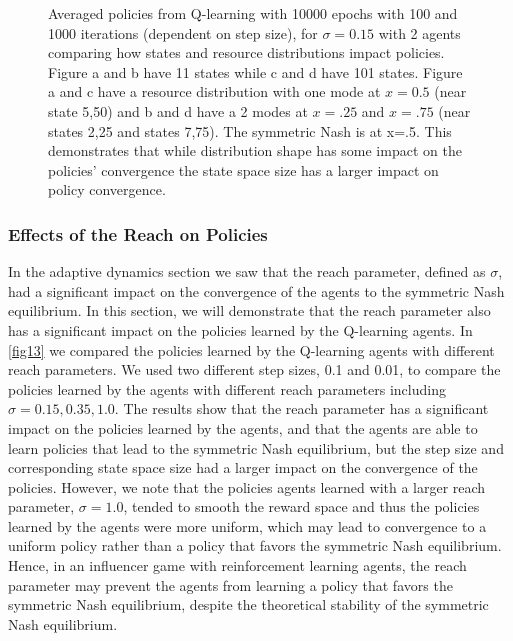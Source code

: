 \documentclass{article}
\begin{document}
\begin{figure}[ht!]
                        
                        \caption{Averaged policies from Q-learning with 10000 epochs with 100 and 1000 iterations (dependent on step size), for $\sigma=0.15$ with 2 agents comparing how states and resource distributions impact policies. Figure a and b have 11 states while c and d have 101 states. Figure a and c have a resource distribution with one mode at $x=0.5$ (near state 5,50) and b and d have a 2 modes at $x=.25$ and $x=.75$ (near states 2,25 and states 7,75). The symmetric Nash is at x=.5. This demonstrates that while distribution shape has some impact on the policies' convergence the state space size has a larger impact on policy convergence. }
                        \label{fig12} 
                \end{figure}
            \clearpage
            \subsubsection{Effects of the Reach on Policies}
                In the adaptive dynamics section we saw that the reach parameter, defined as $\sigma$, had a significant impact on the convergence of the agents to the symmetric Nash equilibrium. In this section, we will demonstrate that the reach parameter also has a significant impact on the policies learned by the Q-learning agents. In \cref{fig13} we compared the policies learned by the Q-learning agents with different reach parameters. We used two different step sizes, 0.1 and 0.01, to compare the policies learned by the agents with different reach parameters including $\sigma=0.15, 0.35,1.0$. The results show that the reach parameter has a significant impact on the policies learned by the agents, and that the agents are able to learn policies that lead to the symmetric Nash equilibrium, but the step size and corresponding state space size had a larger impact on the convergence of the policies. However, we note that the policies agents learned with a larger reach parameter, $\sigma=1.0$, tended to smooth the reward space and thus the policies learned by the agents were more uniform, which may lead to convergence to a uniform policy rather than a policy that favors the symmetric Nash equilibrium. Hence, in an influencer game with reinforcement learning agents, the reach parameter may prevent the agents from learning a policy that favors the symmetric Nash equilibrium, despite the theoretical stability of the symmetric Nash equilibrium. 
            
\end{document}
